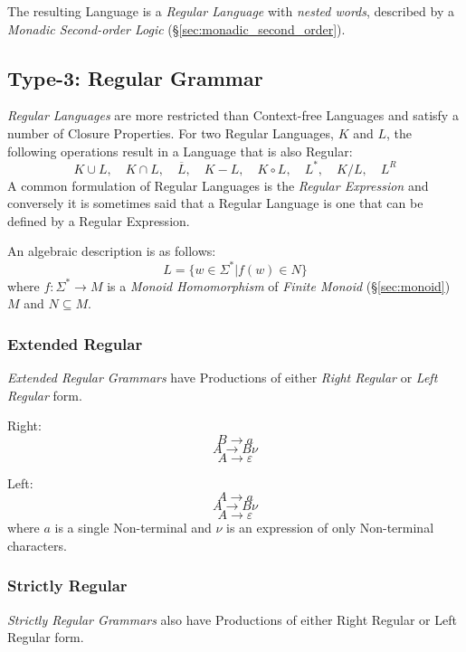 The resulting Language is a \emph{Regular Language} with \emph{nested
  words}, described by a \emph{Monadic Second-order Logic}
(\S\ref{sec:monadic_second_order}).



\subsection{Type-3: Regular Grammar} \label{sec:regular_language}

\emph{Regular Languages} are more restricted than Context-free
Languages and satisfy a number of Closure Properties. For two Regular
Languages, $K$ and $L$, the following operations result in a Language
that is also Regular:
\[
    K \cup L, \quad
    K \cap L, \quad
    \overline{L}, \quad
    K - L, \quad
    K \circ L, \quad
    L^*, \quad
    K / L, \quad
    L^R
\]
A common formulation of Regular Languages is the \emph{Regular
  Expression} and conversely it is sometimes said that a Regular
Language is one that can be defined by a Regular Expression.

An algebraic description is as follows:
\[
    L = \{ w \in \Sigma^* | f(w) \in N \}
\]
where $f : \Sigma^* \rightarrow M$ is a \emph{Monoid Homomorphism} of
\emph{Finite Monoid} (\S\ref{sec:monoid}) $M$ and $N \subseteq M$.



\subsubsection{Extended Regular}\label{sec:extended_regular}
\emph{Extended Regular Grammars} have Productions of either \emph{Right
Regular} or \emph{Left Regular} form.

Right:
\[
    B \rightarrow a
\]\[
    A \rightarrow B \nu
\]\[
    A \rightarrow \varepsilon
\]

Left:
\[
    A \rightarrow a
\]\[
    A \rightarrow B \nu
\]\[
    A \rightarrow \varepsilon
\]
where $a$ is a single Non-terminal and $\nu$ is an expression of only
Non-terminal characters.



\subsubsection{Strictly Regular}\label{sec:strictly_regular}
\emph{Strictly Regular Grammars} also have Productions of either Right
Regular or Left Regular form.

